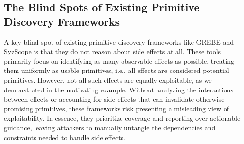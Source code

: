 






\subsection{The Blind Spots of Existing Primitive Discovery Frameworks} 
\label{other_tool_problem}

A key blind spot of existing primitive discovery frameworks like GREBE and SyzScope is that they do not reason about side effects at all. These tools primarily focus on identifying as many observable effects as possible, treating them uniformly as usable primitives, i.e., all effects are considered potential primitives. However, not all such effects are equally exploitable, as we demonstrated in the motivating example. 
Without analyzing the interactions between effects or accounting for side effects that can invalidate otherwise promising primitives, these frameworks risk presenting a misleading view of exploitability. In essence, they prioritize coverage and reporting over actionable guidance, leaving attackers to manually untangle the dependencies and constraints needed to handle side effects.


